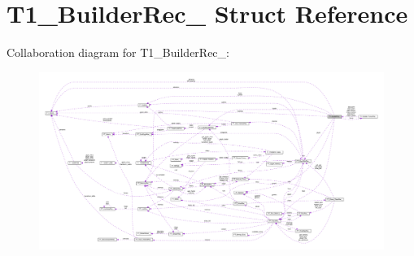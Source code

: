 \hypertarget{structT1__BuilderRec__}{}\section{T1\+\_\+\+Builder\+Rec\+\_\+ Struct Reference}
\label{structT1__BuilderRec__}


Collaboration diagram for T1\+\_\+\+Builder\+Rec\+\_\+\+:
\nopagebreak
\begin{figure}[H]
\begin{center}
\leavevmode
\includegraphics[width=350pt]{structT1__BuilderRec____coll__graph}
\end{center}
\end{figure}
